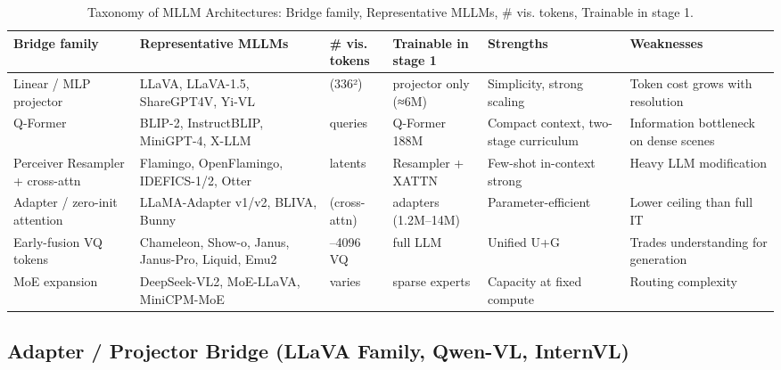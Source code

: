 \documentclass{article}
\begin{document}
\begin{table}[t]
\centering
\caption{Taxonomy of MLLM Architectures: Bridge family, Representative MLLMs, \# vis. tokens, Trainable in stage 1.}
\label{tab:taxonomy-of-mllm-architectures}
\begin{tabular}{>{\raggedright\arraybackslash}p{0.1624\linewidth}
  >{\raggedright\arraybackslash}p{0.2487\linewidth}
  >{\raggedright\arraybackslash}p{0.0863\linewidth}
  >{\raggedright\arraybackslash}p{0.1218\linewidth}
  >{\raggedright\arraybackslash}p{0.1878\linewidth}
  >{\raggedright\arraybackslash}p{0.1929\linewidth}}
\toprule
\textbf{Bridge family} & \textbf{Representative MLLMs} & \textbf{\# vis. tokens} & \textbf{Trainable in stage 1} & \textbf{Strengths} & \textbf{Weaknesses} \\
\midrule
Linear / MLP projector & LLaVA, LLaVA-1.5, ShareGPT4V, Yi-VL & 576 (336²) & projector only (≈6M) & Simplicity, strong scaling & Token cost grows with resolution \\
Q-Former & BLIP-2, InstructBLIP, MiniGPT-4, X-LLM & 32 queries & Q-Former 188M & Compact context, two-stage curriculum & Information bottleneck on dense scenes \\
Perceiver Resampler + cross-attn & Flamingo, OpenFlamingo, IDEFICS-1/2, Otter & 64 latents & Resampler + XATTN & Few-shot in-context strong & Heavy LLM modification \\
Adapter / zero-init attention & LLaMA-Adapter v1/v2, BLIVA, Bunny & 0 (cross-attn) & adapters (1.2M--14M) & Parameter-efficient & Lower ceiling than full IT \\
Early-fusion VQ tokens & Chameleon, Show-o, Janus, Janus-Pro, Liquid, Emu2 & 1024--4096 VQ & full LLM & Unified U+G & Trades understanding for generation \\
MoE expansion & DeepSeek-VL2, MoE-LLaVA, MiniCPM-MoE & varies & sparse experts & Capacity at fixed compute & Routing complexity \\
\end{tabular}
\end{table}

\subsection{Adapter / Projector Bridge (LLaVA Family, Qwen-VL, InternVL)}\label{adapter-projector-bridge-llava-family-qwen-vl-internvl}
\end{document}
